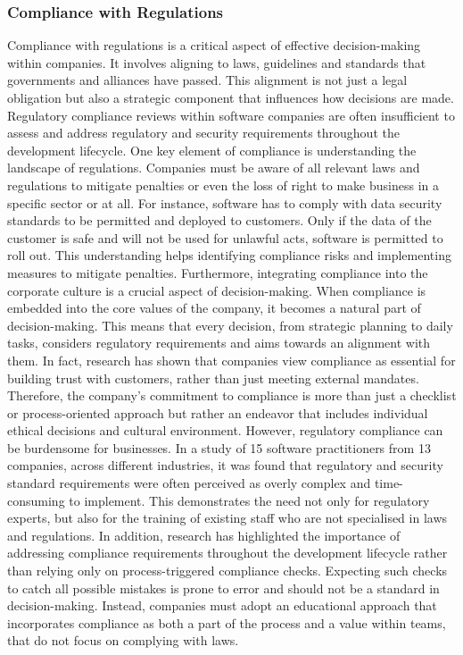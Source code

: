 \subsubsection{Compliance with Regulations}
Compliance with regulations is a critical aspect of effective decision-making within companies. It involves aligning to laws, guidelines and standards that governments and alliances have passed. This alignment is not just a legal obligation but also a strategic component that influences how decisions are made.
Regulatory compliance reviews within software companies are often insufficient to assess and address regulatory and security requirements throughout the development lifecycle.
\newline \noindent One key element of compliance is understanding the landscape of regulations. Companies must be aware of all relevant laws and regulations to mitigate penalties or even the loss of right to make business in a specific sector or at all. For instance, software has to comply with data security standards to be permitted and deployed to customers. Only if the data of the customer is safe and will not be used for unlawful acts, software is permitted to roll out. This understanding helps identifying compliance risks and implementing measures to mitigate penalties. 
\newline \noindent Furthermore, integrating compliance into the corporate culture is a crucial aspect of decision-making. When compliance is embedded into the core values of the company, it becomes a natural part of decision-making. This means that every decision, from strategic planning to daily tasks, considers regulatory requirements and aims towards an alignment with them. In fact, research has shown that companies view compliance as essential for building trust with customers, rather than just meeting external mandates. Therefore, the company's commitment to compliance is more than just a checklist or process-oriented approach but rather an endeavor that includes individual ethical decisions and cultural environment.
\newline \noindent However, regulatory compliance can be burdensome for businesses. In a study of 15 software practitioners from 13 companies, across different industries, it was found that regulatory and security standard requirements were often perceived as overly complex and time-consuming to implement. This demonstrates the need not only for regulatory experts, but also for the training of existing staff who are not specialised in laws and regulations. 
\newline \noindent In addition, research has highlighted the importance of addressing compliance requirements throughout the development lifecycle rather than relying only on process-triggered compliance checks. Expecting such checks to catch all possible mistakes is prone to error and should not be a standard in decision-making. Instead, companies must adopt an educational approach that incorporates compliance as both a part of the process and a value within teams, that do not focus on complying with laws. 
